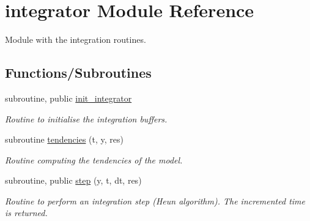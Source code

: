 \hypertarget{namespaceintegrator}{}\section{integrator Module Reference}
\label{namespaceintegrator}


Module with the integration routines.  


\subsection*{Functions/\+Subroutines}
\begin{DoxyCompactItemize}
\item 
subroutine, public \hyperlink{namespaceintegrator_ab01b1930fc627150051ed5c5465ac533}{init\+\_\+integrator}
\begin{DoxyCompactList}\small\item\em Routine to initialise the integration buffers. \end{DoxyCompactList}\item 
subroutine \hyperlink{namespaceintegrator_ae8158ec5bb2be4dca1daadb1a906ba96}{tendencies} (t, y, res)
\begin{DoxyCompactList}\small\item\em Routine computing the tendencies of the model. \end{DoxyCompactList}\item 
subroutine, public \hyperlink{namespaceintegrator_adaf5baacd0ff1905f334ce824cdcd58e}{step} (y, t, dt, res)
\begin{DoxyCompactList}\small\item\em Routine to perform an integration step (Heun algorithm). The incremented time is returned. \end{DoxyCompactList}\end{DoxyCompactItemize}
